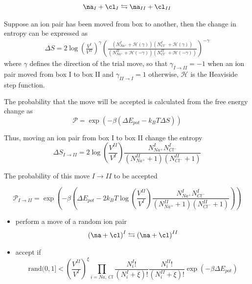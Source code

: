 \begin{equation}
    \na_{I} + \cl_{I} \leftrightarrows \na_{II} + \cl_{II}
\end{equation}

Suppose an ion pair has been moved from box to another, then the change in entropy can be expressed as
\begin{eqnarray}
    \Delta S = 2 \log \left(\frac{V^{I}}{V^{II}} \right) ^ {\gamma}  \left(\frac{(N_{Na^{+}}^{I}+\mathcal{H}(\gamma))(N_{Cl^{-}}^{I}+\mathcal{H}(\gamma))}{(N_{Na^{+}}^{II}+\mathcal{H}(-\gamma))(N_{Cl^{-}}^{II}+\mathcal{H}(-\gamma))}\right)^{-\gamma}
\end{eqnarray}
where $\gamma$ defines the direction of the trial move, so that $\gamma_{I \rightarrow II} = -1$ when an ion pair moved from box I to box II and  $\gamma_{II \rightarrow I} = 1$ otherwise, $\mathcal{H}$ is the Heaviside step function.

The probability that the move will be accepted is calculated from the free energy change as
\begin{equation}
    \mathcal{P} = \exp(-\beta (\Delta E_{pot} - k_B T \Delta S))
\end{equation}

Thus, moving an ion pair from box I to box II change the entropy
\begin{equation}
    \Delta S_{I \rightarrow II} = 2 \log \left(\frac{V^{II}}{V^{I}} \right)  \frac{N_{Na^{+}}^{I} N_{Cl^{-}}^{I}}{(N_{Na^{+}}^{II}+1)(N_{Cl^{-}}^{II}+1)}
\end{equation}

The probability of this move ${I \rightarrow II}$ to be accepted

\begin{equation}
    \mathcal{P}_{I \rightarrow II} = \exp\left(-\beta (\Delta E_{pot} - 2 k_B T \log \left(\frac{V^{II}}{V^{I}} \right)  \frac{N_{Na^{+}}^{I} N_{Cl^{-}}^{I}}{(N_{Na^{+}}^{II}+1)(N_{Cl^{-}}^{II}+1)})\right)
\end{equation}

\begin{itemize}
\item perform a move of a random ion pair 
    \begin{equation}
    \left(\na +\cl\right)^{I} \leftrightarrows\left(\na +\cl\right)^{II}
\end{equation}

\item accept if 
    \begin{equation}
    \mathrm{rand}(0,1] < \left(\frac{V^{II}}{V^{I}}\right)^{\xi}\prod_{i=Na,\ Cl}\frac{N^I_i!}{(N^I_i+\xi)!}\frac{N^{II}_i!}{(N^{II}_i+\xi)!}\exp(-\beta\Delta E_{pot})
\end{equation}
\end{itemize}



